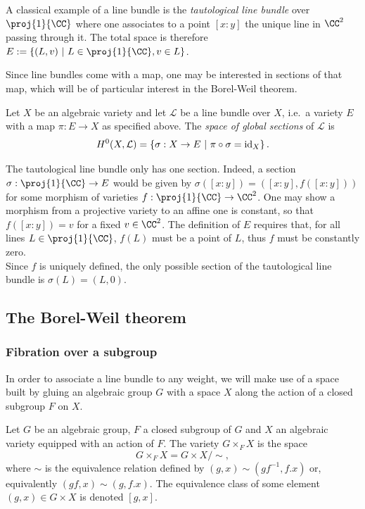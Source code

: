 A classical example of a line bundle is the \emph{tautological line bundle} over $\proj{1}{\CC}$ where one associates to a point $[x:y]$ the unique line in $\CC^2$ passing through it. The total space is therefore $E := \left\{(L, v) ~\middle|~ L \in \proj{1}{\CC}, v \in L\right\}$.

Since line bundles come with a map, one may be interested in sections of that map, which will be of particular interest in the Borel-Weil theorem.
\begin{defn}
    Let $X$ be an algebraic variety and let $\mathcal{L}$ be a line bundle over $X$, i.e.\ a variety $E$ with a map $\pi: E \rightarrow X$ as specified above. The \emph{space of global sections} of $\mathcal{L}$ is
    \[ H^0(X, \mathcal{L}) = \left\{\sigma: X \to E ~\middle|~ \pi \circ \sigma = \textnormal{id}_{X}\right\}.\]
\end{defn}
The tautological line bundle only has one section. Indeed, a section $\sigma: \proj{1}{\CC} \to E$ would be given by $\sigma([x:y]) = ([x:y], f([x:y]))$ for some morphism of varieties $f: \proj{1}{\CC} \to \CC^2$. One may show a morphism from a projective variety to an affine one is constant, so that $f([x:y]) = v$ for a fixed $v \in \CC^2$. The definition of $E$ requires that, for all lines $L \in \proj{1}{\CC}$, $f(L)$ must be a point of $L$, thus $f$ must be constantly zero.\\
Since $f$ is uniquely defined, the only possible section of the tautological line bundle is $\sigma(L) = (L, 0)$.

\subsection{The Borel-Weil theorem}
\subsubsection{Fibration over a subgroup}
In order to associate a line bundle to any weight, we will make use of a space built by gluing an algebraic group $G$ with a space $X$ along the action of a closed subgroup $F$ on $X$.

\begin{defn}
    Let $G$ be an algebraic group, $F$ a closed subgroup of $G$ and $X$ an algebraic variety equipped with an action of $F$. The variety $G \times_F X$ is the space
    \[ G \times_F X = G \times X / \sim, \]
    where $\sim$ is the equivalence relation defined by $(g, x) \sim (g f^{-1}, f.x)$ or, equivalently $(g f, x) \sim (g, f . x)$. The equivalence class of some element $(g, x) \in G\times X$ is denoted $[g,x]$.
\end{defn}

